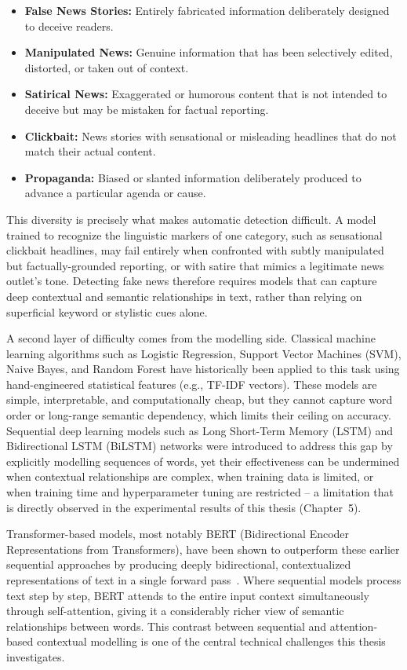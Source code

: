 \begin{itemize}
\item \textbf{False News Stories:} Entirely fabricated information deliberately designed to deceive readers.
\item \textbf{Manipulated News:} Genuine information that has been selectively edited, distorted, or taken out of context.
\item \textbf{Satirical News:} Exaggerated or humorous content that is not intended to deceive but may be mistaken for factual reporting.
\item \textbf{Clickbait:} News stories with sensational or misleading headlines that do not match their actual content.
\item \textbf{Propaganda:} Biased or slanted information deliberately produced to advance a particular agenda or cause.
\end{itemize}

This diversity is precisely what makes automatic detection difficult. A model trained to recognize the linguistic markers of one category, such as sensational clickbait headlines, may fail entirely when confronted with subtly manipulated but factually-grounded reporting, or with satire that mimics a legitimate news outlet's tone. Detecting fake news therefore requires models that can capture deep contextual and semantic relationships in text, rather than relying on superficial keyword or stylistic cues alone.

A second layer of difficulty comes from the modelling side. Classical machine learning algorithms such as Logistic Regression, Support Vector Machines (SVM), Naive Bayes, and Random Forest have historically been applied to this task using hand-engineered statistical features (e.g., TF-IDF vectors). These models are simple, interpretable, and computationally cheap, but they cannot capture word order or long-range semantic dependency, which limits their ceiling on accuracy. Sequential deep learning models such as Long Short-Term Memory (LSTM) and Bidirectional LSTM (BiLSTM) networks were introduced to address this gap by explicitly modelling sequences of words, yet their effectiveness can be undermined when contextual relationships are complex, when training data is limited, or when training time and hyperparameter tuning are restricted -- a limitation that is directly observed in the experimental results of this thesis (Chapter~5).

Transformer-based models, most notably BERT (Bidirectional Encoder Representations from Transformers), have been shown to outperform these earlier sequential approaches by producing deeply bidirectional, contextualized representations of text in a single forward pass~\citep{Kaliyar2021FakeBERT,Mehta2022RecentTrends}. Where sequential models process text step by step, BERT attends to the entire input context simultaneously through self-attention, giving it a considerably richer view of semantic relationships between words. This contrast between sequential and attention-based contextual modelling is one of the central technical challenges this thesis investigates.


